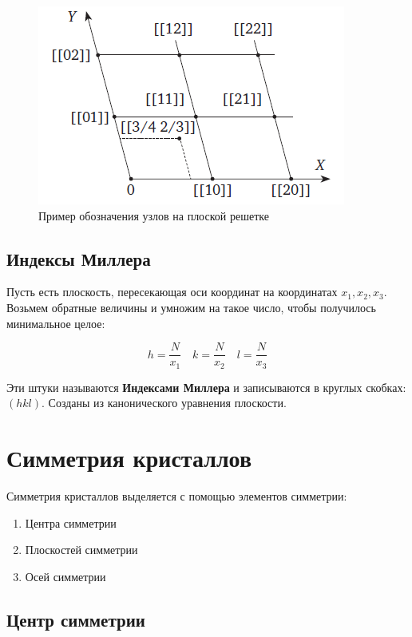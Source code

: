 \documentclass[a4paper, 12pt]{article}
\begin{document}

\begin{figure}[H]
	\centering
	\includegraphics[width=0.5\linewidth]{Coordinates}
	\caption{Пример обозначения узлов на плоской решетке}
	\label{fig:coord}
\end{figure}

\subsection{Индексы Миллера}

Пусть есть плоскость, пересекающая оси координат на координатах $x_1, x_2, x_3$. Возьмем обратные величины и умножим на такое число, чтобы получилось минимальное целое:

\begin{equation}
	h = \frac{N}{x_1} \quad k = \frac{N}{x_2} \quad l = \frac{N}{x_3}
\end{equation}

Эти штуки называются \textbf{Индексами Миллера} и записываются в круглых скобках: $(hkl)$. Созданы из канонического уравнения плоскости.

\section{Симметрия кристаллов}

Симметрия кристаллов выделяется с помощью элементов симметрии:

\begin{enumerate}
	\item Центра симметрии
	
	\item Плоскостей симметрии
	
	\item Осей симметрии
\end{enumerate}

\subsection{Центр симметрии}
\end{document}
